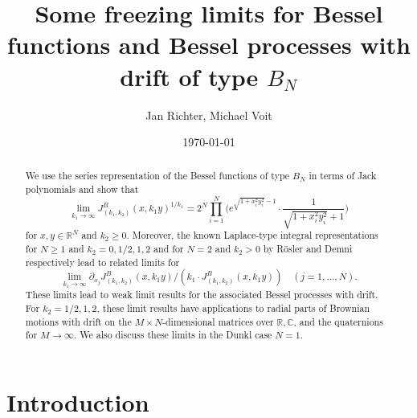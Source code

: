 \documentclass[reqno]{amsart}
\title[Freezing limits for Bessel functions and Bessel processes]{Some freezing limits for Bessel functions and Bessel processes with drift of type $B_N$}
\author{Jan Richter, Michael Voit}
\theoremstyle{plain}
\theoremstyle{definition}
\numberwithin{equation}{section}
\begin{document}
\date{\today}


\begin{abstract}
  We use the series representation of the Bessel functions of type $B_N$ in terms of Jack polynomials and show that
  $$\lim_{k_1\to\infty} J_{(k_1,k_2)}^B(x,k_1y)^{1/k_1}= 2^N\prod\limits_{i=1}^N
  \Bigg( e^{\sqrt{1+x_i^2 y_i^2}-1}\cdot \frac{1}{\sqrt{1+x_i^2 y_i^2}+1} \Bigg)$$
  for  $x,y\in\mathbb R^N$ and $k_2\ge0$.
  Moreover, the known Laplace-type integral representations for $N\ge1$ and $k_2=0,1/2,1,2$
and for $N=2$ and $k_2>0$ by R\"osler and Demni respectively lead to related limits for
$$\lim_{k_1 \to \infty} \partial_{x_j} J_{(k_1,k_2)}^B(x,k_1y) /(k_1 \cdot J_{(k_1,k_2)}^B(x,k_1 y)) \quad (j=1,\ldots,N).$$
  These limits lead to weak limit results for the associated Bessel processes with drift.
  For $k_2=1/2,1,2$, these limit results have applications to radial parts of Brownian motions with drift on the
  $M\times N$-dimensional matrices over $\mathbb R,\mathbb C$, and the quaternions for $M\to\infty$.
  We also discuss these limits in the Dunkl case $N=1$.
\end{abstract}


\maketitle



\section{Introduction}
\end{document}
